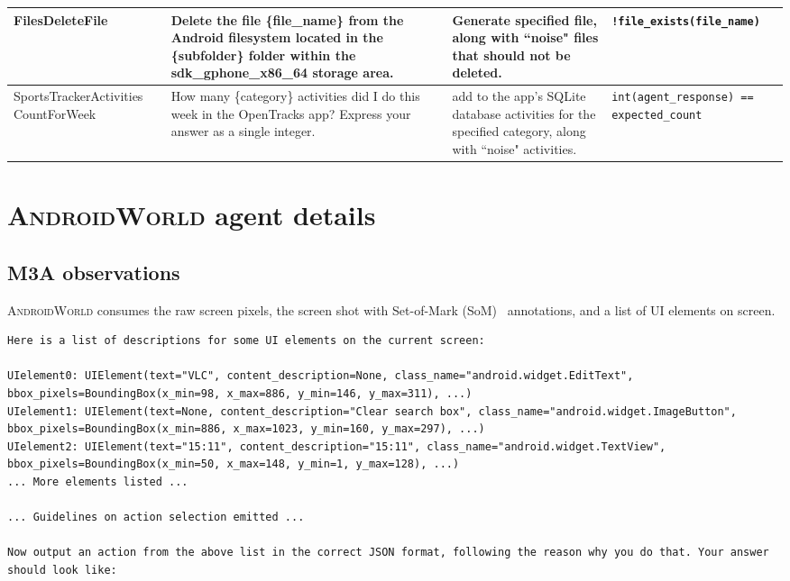 \documentclass{article}
\newcommand{\system}{\textsc{AndroidWorld}\xspace}
\newcommand{\agent}{\textsc{M3A}\xspace}
\begin{document}
\begin{appendices}
\begin{table}[h]
{\begin{tabular}{p{3.3cm}p{5.9cm}p{3.6cm}p{5.4cm}}
    \midrule
    FilesDeleteFile & Delete the file \{file\_name\} from the Android filesystem located in the \{subfolder\} folder within the sdk\_gphone\_x86\_64 storage area. & Generate specified file, along with ``noise" files that should not be deleted. & \texttt{!file\_exists(file\_name)}\\
    \midrule
    SportsTrackerActivities CountForWeek & How many \{category\} activities did I do this week in the OpenTracks app? Express your answer as a single integer. & add to the app's SQLite database activities for the specified category, along with ``noise" activities.  & \texttt{int(agent\_response) == expected\_count} \\
    \bottomrule
    \end{tabular}
}
\label{table:task-list}
\end{table}

\section{\system agent details}
\label{sec:agent_details}

\subsection{\agent observations}

\system consumes the raw screen pixels, the screen shot with Set-of-Mark (SoM)~\citep{yang2023set} annotations, and a list of UI elements on screen.

\begin{lstlisting}[basicstyle=\ttfamily\footnotesize, style=mystyle, caption={ The prompt format pertaining to screen representation with UI elements.}]
Here is a list of descriptions for some UI elements on the current screen:

UIelement0: UIElement(text="VLC", content_description=None, class_name="android.widget.EditText",
bbox_pixels=BoundingBox(x_min=98, x_max=886, y_min=146, y_max=311), ...)
UIelement1: UIElement(text=None, content_description="Clear search box", class_name="android.widget.ImageButton",
bbox_pixels=BoundingBox(x_min=886, x_max=1023, y_min=160, y_max=297), ...)
UIelement2: UIElement(text="15:11", content_description="15:11", class_name="android.widget.TextView",
bbox_pixels=BoundingBox(x_min=50, x_max=148, y_min=1, y_max=128), ...)
... More elements listed ...

... Guidelines on action selection emitted ...

Now output an action from the above list in the correct JSON format, following the reason why you do that. Your answer should look like:


\end{lstlisting}
\end{appendices}
\end{document}
